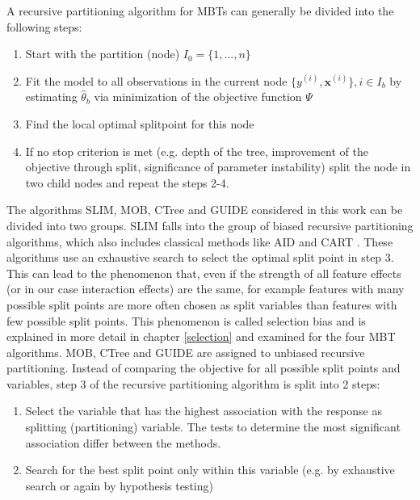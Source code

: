 A recursive partitioning algorithm for MBTs can generally be divided into the following steps:
\begin{enumerate}
    \item Start with the partition (node) $I_0 = \{1,...,n\}$
    \item Fit the model to all observations in the current node $\{y^{(i)}, \mathbf{x}^{(i)}\}, i \in I_b$ by estimating $\hat{\theta}_b$ via minimization of the objective function $\Psi$
    \item Find the local optimal splitpoint for this node 
    \item If no stop criterion is met (e.g. depth of the tree, improvement of the objective through split, significance of parameter instability) split the node in two child nodes and repeat the steps 2-4.
\end{enumerate}


The algorithms SLIM, MOB, CTree and GUIDE considered in this work can be divided into two groups. SLIM falls into the group of biased recursive partitioning algorithms, which also includes classical methods like AID \citep{Morgan.1963} and CART \citep{Breiman.1984}. These algorithms use an exhaustive search to select the optimal split point in step 3. This can lead to the phenomenon that, even if the strength of all feature effects (or in our case interaction effects) are the same, for example features with many possible split points are more often chosen as split variables than features with few possible split points. This phenomenon is called selection bias and is explained in more detail in chapter \ref{selection} and examined for the four MBT algorithms.
MOB, CTree and GUIDE are assigned to unbiased recursive partitioning. Instead of comparing the objective for all possible split points and variables, step 3 of the recursive partitioning algorithm is split into 2 steps:

\begin{enumerate}
    \item Select the variable that has the highest association with the response as splitting (partitioning) variable. The tests to determine the most significant association differ between the methods.
    \item Search for the best split point only within this variable (e.g. by exhaustive search or again by hypothesis testing)
\end{enumerate}

\citep{Schlosser.2019}



